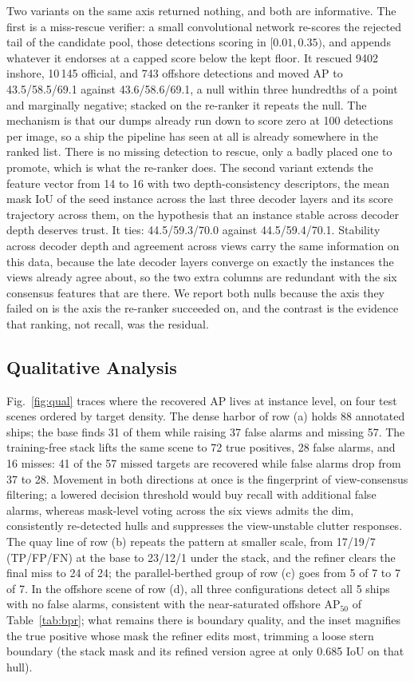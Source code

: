 Two variants on the same axis returned nothing, and both are informative. The first is a miss-rescue verifier: a small convolutional network re-scores the rejected tail of the candidate pool, those detections scoring in $[0.01, 0.35)$, and appends whatever it endorses at a capped score below the kept floor. It rescued 9402 inshore, 10\,145 official, and 743 offshore detections and moved AP to 43.5/58.5/69.1 against 43.6/58.6/69.1, a null within three hundredths of a point and marginally negative; stacked on the re-ranker it repeats the null. The mechanism is that our dumps already run down to score zero at 100 detections per image, so a ship the pipeline has seen at all is already somewhere in the ranked list. There is no missing detection to rescue, only a badly placed one to promote, which is what the re-ranker does. The second variant extends the feature vector from 14 to 16 with two depth-consistency descriptors, the mean mask IoU of the seed instance across the last three decoder layers and its score trajectory across them, on the hypothesis that an instance stable across decoder depth deserves trust. It ties: 44.5/59.3/70.0 against 44.5/59.4/70.1. Stability across decoder depth and agreement across views carry the same information on this data, because the late decoder layers converge on exactly the instances the views already agree about, so the two extra columns are redundant with the six consensus features that are there. We report both nulls because the axis they failed on is the axis the re-ranker succeeded on, and the contrast is the evidence that ranking, not recall, was the residual.

\subsection{Qualitative Analysis}\label{sec:exp:qual}

Fig.~\ref{fig:qual} traces where the recovered AP lives at instance level, on four test scenes ordered by target density. The dense harbor of row (a) holds 88 annotated ships; the base finds 31 of them while raising 37 false alarms and missing 57. The training-free stack lifts the same scene to 72 true positives, 28 false alarms, and 16 misses: 41 of the 57 missed targets are recovered while false alarms drop from 37 to 28. Movement in both directions at once is the fingerprint of view-consensus filtering; a lowered decision threshold would buy recall with additional false alarms, whereas mask-level voting across the six views admits the dim, consistently re-detected hulls and suppresses the view-unstable clutter responses. The quay line of row (b) repeats the pattern at smaller scale, from 17/19/7 (TP/FP/FN) at the base to 23/12/1 under the stack, and the refiner clears the final miss to 24 of 24; the parallel-berthed group of row (c) goes from 5 of 7 to 7 of 7. In the offshore scene of row (d), all three configurations detect all 5 ships with no false alarms, consistent with the near-saturated offshore AP$_{50}$ of Table~\ref{tab:bpr}; what remains there is boundary quality, and the inset magnifies the true positive whose mask the refiner edits most, trimming a loose stern boundary (the stack mask and its refined version agree at only 0.685 IoU on that hull).

